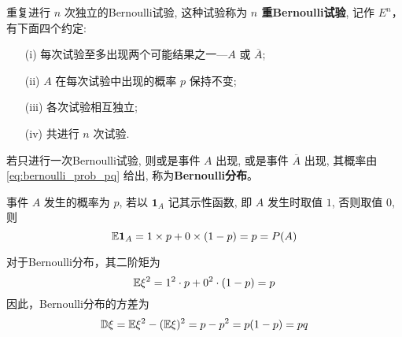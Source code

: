 \begin{definition}[n重Bernoulli试验]
    重复进行 $n$ 次独立的Bernoulli试验, 这种试验称为 \textbf{$n$ 重Bernoulli试验}, 记作 $E^n$，有下面四个约定:
\begin{enumerate}
    \item[(i)] 每次试验至多出现两个可能结果之一—$A$ 或 $\overline{A}$;
    \item[(ii)] $A$ 在每次试验中出现的概率 $p$ 保持不变;
    \item[(iii)] 各次试验相互独立;
    \item[(iv)] 共进行 $n$ 次试验.
\end{enumerate}
\end{definition}
\begin{definition} \label{def:bernoulli_distribution}
若只进行一次Bernoulli试验, 则或是事件 $A$ 出现, 或是事件 $\overline{A}$ 出现, 其概率由 \eqref{eq:bernoulli_prob_pq} 给出, 称为\textbf{Bernoulli分布}。
\end{definition}
\begin{proposition} \label{prop:bernoulli_expectation}
事件 $A$ 发生的概率为 $p$, 若以 $\mathbf{1}_A$ 记其示性函数, 即 $A$ 发生时取值 $1$, 否则取值 $0$, 则
\[
\mathbb{E}\mathbf{1}_A = 1 \times p + 0 \times (1 - p) = p = P(A)
\]
\end{proposition}
\begin{proposition} \label{prop:bernoulli_variance}
对于Bernoulli分布，其二阶矩为
\[
\mathbb{E}\xi^2 = 1^2 \cdot p + 0^2 \cdot (1 - p) = p
\]
因此，Bernoulli分布的方差为
\begin{equation} \label{eq:bernoulli_variance_formula}
\mathbb{D}\xi = \mathbb{E}\xi^2 - (\mathbb{E}\xi)^2 = p - p^2 = p(1-p) = pq
\end{equation}
\end{proposition}
